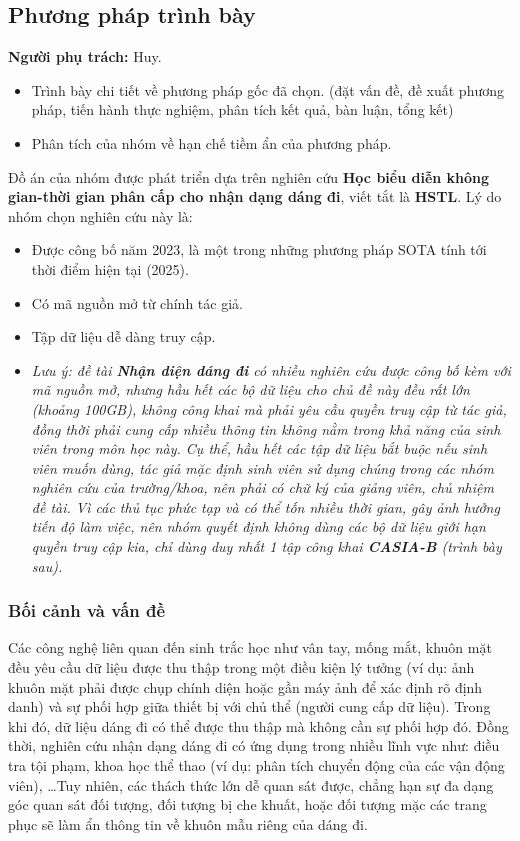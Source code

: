 \subsection{Phương pháp trình bày}

\textbf{Người phụ trách:} Huy.

\begin{itemize}
    \item Trình bày chi tiết về phương pháp gốc đã chọn. (đặt vấn đề, đề xuất phương pháp, tiến hành thực nghiệm, phân tích kết quả, bàn luận, tổng kết)
    \item Phân tích của nhóm về hạn chế tiềm ẩn của phương pháp.
\end{itemize}

Đồ án của nhóm được phát triển dựa trên nghiên cứu \textbf{Học biểu diễn không gian-thời gian phân cấp cho nhận dạng dáng đi}\cite{hstl}, viết tắt là \textbf{HSTL}. Lý do nhóm chọn nghiên cứu này là:
\begin{itemize}
    \item Được công bố năm 2023, là một trong những phương pháp SOTA tính tới thời điểm hiện tại (2025).
    \item Có mã nguồn mở từ chính tác giả.
    \item Tập dữ liệu dễ dàng truy cập.
    \item \textit{Lưu ý: đề tài \textbf{Nhận diện dáng đi} có nhiều nghiên cứu được công bố kèm với mã nguồn mở, nhưng hầu hết các bộ dữ liệu cho chủ đề này đều rất lớn (khoảng 100GB), không công khai mà phải yêu cầu quyền truy cập từ tác giả, đồng thời phải cung cấp nhiều thông tin không nằm trong khả năng của sinh viên trong môn học này. Cụ thể, hầu hết các tập dữ liệu bắt buộc nếu sinh viên muốn dùng, tác giả mặc định sinh viên sử dụng chúng trong các nhóm nghiên cứu của trường/khoa, nên phải có chữ ký của giảng viên, chủ nhiệm đề tài. Vì các thủ tục phức tạp và có thể tốn nhiều thời gian, gây ảnh hưởng tiến độ làm việc, nên nhóm quyết định không dùng các bộ dữ liệu giới hạn quyền truy cập kia, chỉ dùng duy nhất 1 tập công khai \textbf{CASIA-B} (trình bày sau).}
\end{itemize}

\subsubsection{Bối cảnh và vấn đề}

Các công nghệ liên quan đến sinh trắc học như vân tay, mống mắt, khuôn mặt đều yêu cầu dữ liệu được thu thập trong một điều kiện lý tưởng (ví dụ: ảnh khuôn mặt phải được chụp chính diện hoặc gần máy ảnh để xác định rõ định danh) và sự phối hợp giữa thiết bị với chủ thể (người cung cấp dữ liệu). Trong khi đó, dữ liệu dáng đi có thể được thu thập mà không cần sự phối hợp đó. Đồng thời, nghiên cứu nhận dạng dáng đi có ứng dụng trong nhiều lĩnh vực như: điều tra tội phạm, khoa học thể thao (ví dụ: phân tích chuyển động của các vận động viên), \dots Tuy nhiên, các thách thức lớn dễ quan sát được, chẳng hạn sự đa dạng góc quan sát đối tượng, đối tượng bị che khuất, hoặc đối tượng mặc các trang phục sẽ làm ẩn thông tin về khuôn mẫu riêng của dáng đi.

